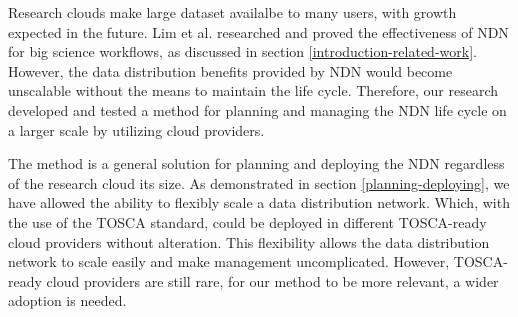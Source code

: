 








Research clouds make large dataset availalbe to many users, with growth expected in the future. Lim et al. researched and proved the effectiveness of NDN for big science workflows, as discussed in section \ref{introduction-related-work}. However, the data distribution benefits provided by NDN would become unscalable without the means to maintain the life cycle. Therefore, our research developed and tested a method for planning and managing the NDN life cycle on a larger scale by utilizing cloud providers.

The method is a general solution for planning and deploying the NDN regardless of the research cloud its size. As demonstrated in section \ref{planning-deploying}, we have allowed the ability to flexibly scale a data distribution network. Which, with the use of the TOSCA standard, could be deployed in different TOSCA-ready cloud providers without alteration. This flexibility allows the data distribution network to scale easily and make management uncomplicated. However, TOSCA-ready cloud providers are still rare, for our method to be more relevant, a wider adoption is needed.

